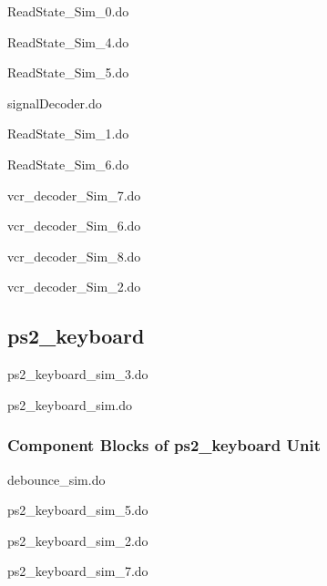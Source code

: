 \documentclass[a4paper]{article}
\begin{document}
ReadState\_Sim\_0.do


ReadState\_Sim\_4.do


ReadState\_Sim\_5.do


signalDecoder.do


ReadState\_Sim\_1.do


ReadState\_Sim\_6.do


vcr\_decoder\_Sim\_7.do


vcr\_decoder\_Sim\_6.do


vcr\_decoder\_Sim\_8.do


vcr\_decoder\_Sim\_2.do


\clearpage

\subsection{ps2\_keyboard}
ps2\_keyboard\_sim\_3.do


ps2\_keyboard\_sim.do


\subsubsection{Component Blocks of ps2\_keyboard Unit}
debounce\_sim.do


ps2\_keyboard\_sim\_5.do


ps2\_keyboard\_sim\_2.do


ps2\_keyboard\_sim\_7.do

\end{document}

